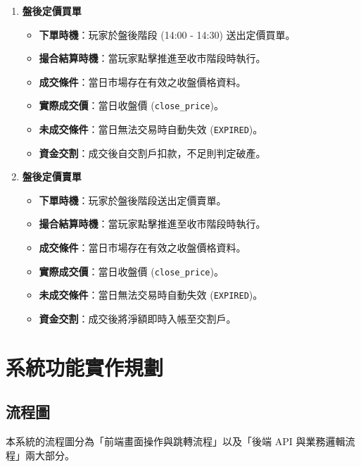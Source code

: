 \documentclass[UTF8, a4paper, 12pt, fontset=none]{ctexart}
\begin{document}
\begin{enumerate}[label=(\arabic*)]
        \item \textbf{盤後定價買單}
        \begin{itemize}
            \item \textbf{下單時機}：玩家於盤後階段 (14:00 - 14:30) 送出定價買單。
            \item \textbf{撮合結算時機}：當玩家點擊推進至收市階段時執行。
            \item \textbf{成交條件}：當日市場存在有效之收盤價格資料。
            \item \textbf{實際成交價}：當日收盤價 (\texttt{close\_price})。
            \item \textbf{未成交條件}：當日無法交易時自動失效 (\texttt{EXPIRED})。
            \item \textbf{資金交割}：成交後自交割戶扣款，不足則判定破產。
        \end{itemize}

        \item \textbf{盤後定價賣單}
        \begin{itemize}
            \item \textbf{下單時機}：玩家於盤後階段送出定價賣單。
            \item \textbf{撮合結算時機}：當玩家點擊推進至收市階段時執行。
            \item \textbf{成交條件}：當日市場存在有效之收盤價格資料。
            \item \textbf{實際成交價}：當日收盤價 (\texttt{close\_price})。
            \item \textbf{未成交條件}：當日無法交易時自動失效 (\texttt{EXPIRED})。
            \item \textbf{資金交割}：成交後將淨額即時入帳至交割戶。
        \end{itemize}
    \end{enumerate}
    \section{系統功能實作規劃}
    \subsection{流程圖}
    本系統的流程圖分為「前端畫面操作與跳轉流程」以及「後端 API 與業務邏輯流程」兩大部分。
\end{document}
